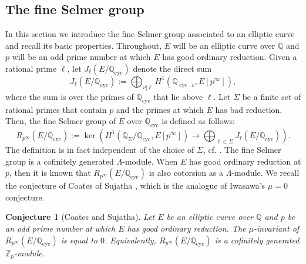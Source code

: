 \documentclass[12pt]{amsart}
\newtheorem{conjecture}[theorem]{Conjecture}
\newcommand{\Z}{\mathbb{Z}}
\newcommand{\Q}{\mathbb{Q}}
\newcommand{\op}[1]{\operatorname{#1}}
\numberwithin{equation}{section}
\begin{document}
\subsection{The fine Selmer group}
\par In this section we introduce the fine Selmer group associated to an elliptic curve and recall its basic properties. Throughout, $E$ will be an elliptic curve over $\Q$ and $p$ will be an odd prime number at which $E$ has good ordinary reduction. Given a rational prime $\ell$, let $J_\ell(E/\Q_{\op{cyc}})$ denote the direct sum 
\[J_\ell(E/\Q_{\op{cyc}}):=\bigoplus_{v|\ell} H^1(\Q_{\op{cyc}, v}, E[p^\infty]),\] where the sum is over the primes of $\Q_{\op{cyc}}$ that lie above $\ell$. Let $\Sigma$ be a finite set of rational primes that contain $p$ and the primes at which $E$ has bad reduction. Then, the fine Selmer group of $E$ over $\Q_{\op{cyc}}$ is defined as follows:
\begin{equation}\label{def of fine selmer}R_{p^\infty}(E/\Q_{\op{cyc}}):=\op{ker}\left( H^1(\Q_{\Sigma}/\Q_{\op{cyc}}, E[p^\infty])\longrightarrow \bigoplus_{\ell\in \Sigma} J_\ell(E/\Q_{\op{cyc}})\right). \end{equation}
The definition is in fact independent of the choice of $\Sigma$, cf. \cite[section 3]{sujathawitte}. The fine Selmer group is a cofinitely generated $\Lambda$-module. When $E$ has good ordinary reduction at $p$, then it is known that $R_{p^\infty}(E/\Q_{\op{cyc}})$ is also cotorsion as a $\Lambda$-module. We recall the conjecture of Coates of Sujatha \cite[Conjecture A]{CoatesSujathaMathAnnalen}, which is the analogue of Iwasawa's $\mu=0$ conjecture.
\begin{conjecture}[Coates and Sujatha]
    Let $E$ be an elliptic curve over $\Q$ and $p$ be an odd prime number at which $E$ has good ordinary reduction. The $\mu$-invariant of $R_{p^\infty}(E/\Q_{\op{cyc}})$ is equal to $0$. Equivalently, $R_{p^\infty}(E/\Q_{\op{cyc}})$ is a cofinitely generated $\Z_p$-module. 
\end{conjecture}
\end{document}
